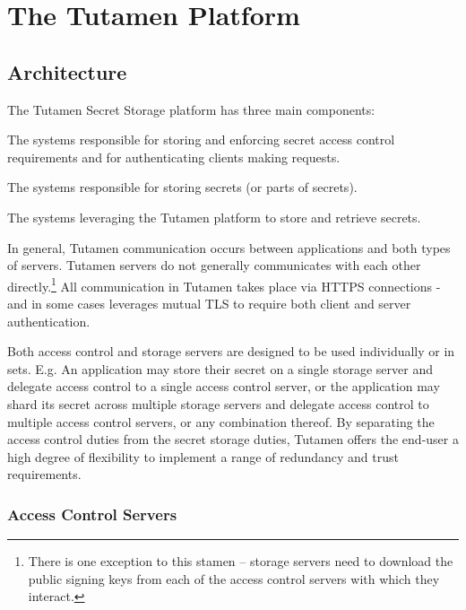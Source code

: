 \section{The Tutamen Platform}
\label{sec:tutamen}

\subsection{Architecture}
\label{sec:tutamen:arch}

The Tutamen Secret Storage platform has three main components:

\begin{packed_desc}
\item[Access Control Servers (ACS):] The systems responsible for
  storing and enforcing secret access control requirements and for
  authenticating clients making requests.
\item[Storage Servers (SS):] The systems responsible for storing
  secrets (or parts of secrets).
\item[Applications:] The systems leveraging the Tutamen platform to
  store and retrieve secrets.
\end{packed_desc}

In general, Tutamen communication occurs between applications and both
types of servers. Tutamen servers do not generally communicates with
each other directly.\footnote{There is one exception to this stamen --
  storage servers need to download the public signing keys from each
  of the access control servers with which they interact.} All
communication in Tutamen takes place via HTTPS connections - and in
some cases leverages mutual TLS to require both client and server
authentication.

Both access control and storage servers are designed to be used
individually or in sets. E.g. An application may store their secret
on a single storage server and delegate access control to a single
access control server, or the application may shard its secret across
multiple storage servers and delegate access control to multiple
access control servers, or any combination thereof. By separating the
access control duties from the secret storage duties, Tutamen offers
the end-user a high degree of flexibility to implement a range of
redundancy and trust requirements.

\subsubsection{Access Control Servers}
\label{sec:tutamen:arch:acs}

